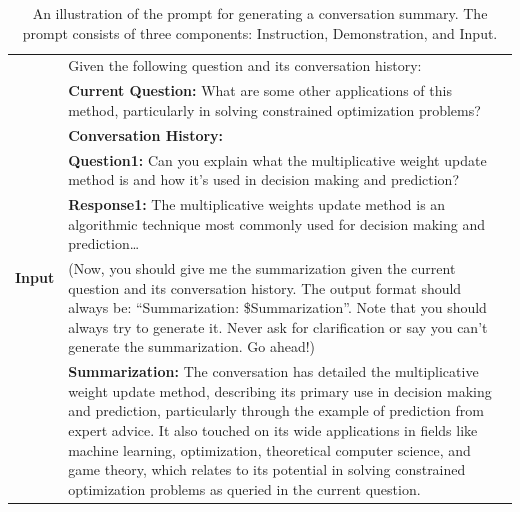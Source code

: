 \documentclass[11pt]{article}
\begin{document}
\begin{table}[http]
\begin{tabular}{c p{12cm}}
\midrule



\multirow{12}{*}{\textbf{Input}} & Given the following question and its conversation history: \\
& \textbf{Current Question:} What are some other applications of this method, particularly in solving constrained optimization problems?  \\
& \textbf{Conversation History:} \\

& \textbf{Question1:} Can you explain what the multiplicative weight update method is and how it's used in decision making and prediction? \\
& \textbf{Response1:} The multiplicative weights update method is an algorithmic technique most commonly used for decision making and prediction\dots \\
&(Now, you should give me the summarization given the current question and its conversation history. The output format should always be: ``Summarization: \$Summarization''. Note that you should always try to generate it. Never ask for clarification or say you can't generate the summarization. Go ahead!) \\
\midrule




\multirow{6}{*}{\textbf{Model Output}} & \textbf{Summarization:} The conversation has detailed the multiplicative weight update method, describing its primary use in decision making and prediction, particularly through the example of prediction from expert advice. It also touched on its wide applications in fields like machine learning, optimization, theoretical computer science, and game theory, which relates to its potential in solving constrained optimization problems as queried in the current question. \\
\bottomrule

\end{tabular}
\caption{An illustration of the prompt for generating a conversation summary. The prompt consists of three components: Instruction, Demonstration, and Input.}
\label{prompt_of_summarizing_conversation_history}
\end{table}
\end{document}
